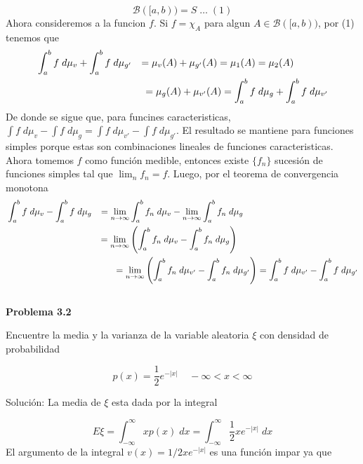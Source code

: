 \documentclass[12pt]{article}
\begin{document}
    \[\mathscr{B}([a,b)) = S\; \ldots\; (1)\]
    Ahora consideremos a la funcion $f$. Si $f = \chi_A$ para algun 
    $A\in \mathscr{B}([a,b))$, por (1) tenemos que 
    \begin{equation*}
        \begin{aligned}
            & \int_a^b f\;d\mu_v+\int_a^b f\;d\mu_{g'} & = \mu_v(A)+\mu_{g'}(A) = \mu_1(A) = \mu_2(A) \hspace*{35pt}&\\
            & & = \mu_g(A)+\mu_{v'}(A) = \int_a^b f\;d\mu_g+\int_a^b f\;d\mu_{v'}
        \end{aligned}
    \end{equation*}
    De donde se sigue que, para funcines caracteristicas, 
    $\int f\;d\mu_v-\int f\;d\mu_g = \int f\;d\mu_{v'}-\int f\;d\mu_{g'}$. 
    El resultado se mantiene para funciones simples porque estas son combinaciones lineales
    de funciones caracteristicas. Ahora tomemos $f$ como funci\'on medible, entonces existe 
    $\{f_n\}$ sucesi\'on de funciones simples tal que $\lim_nf_n = f$. Luego, por el 
    teorema de convergencia monotona 
    \begin{equation*}
        \begin{aligned}
            & \int_a^bf\;d\mu_v-\int_a^bf\;d\mu_g  & = \lim_{n\rightarrow \infty}\int_a^bf_n\;d\mu_v-\lim_{n\rightarrow \infty}\int_a^bf_n\;d\mu_g \hspace*{127pt} \\
            & & = \lim_{n\rightarrow \infty} \left(\int_a^bf_n\;d\mu_v-\int_a^bf_n\;d\mu_g\right) \hspace*{134pt} \\
            & & = \lim_{n\rightarrow \infty} \left(\int_a^bf_n\;d\mu_{v'}-\int_a^bf_n\;d\mu_{g'}\right) = \int_a^bf\;d\mu_{v'}-\int_a^bf\;d\mu_{g'}
        \end{aligned}
    \end{equation*}
    \\ 

    \textbf{Problema 3.2}

    Encuentre la media y la varianza de la variable aleatoria $\xi$ con densidad de 
    probabilidad

    \[p(x) = \frac{1}{2}e^{-|x|}\;\;\;\; -\infty < x < \infty\]
    
    Soluci\'on: La media de $\xi$ esta dada por la integral

    \[E\xi = \int_{-\infty}^{\infty} xp(x)\;dx = \int_{-\infty}^{\infty} \frac{1}{2}xe^{-|x|}\;dx\]
    El argumento de la integral $v(x) = 1/2xe^{-|x|}$ es una funci\'on impar ya que 
\end{document}
